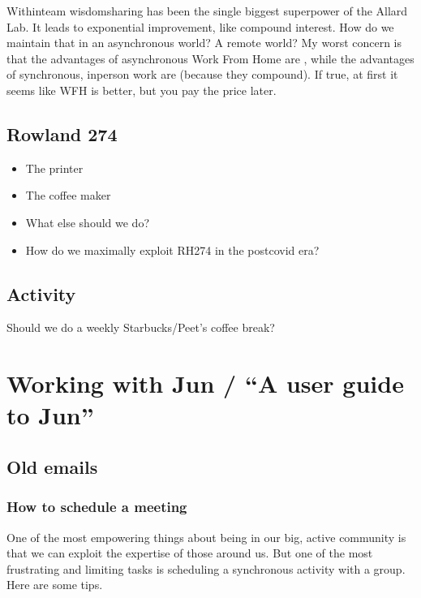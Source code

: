 \documentclass[letterpaper,10pt,english]{sphinxmanual}
\begin{document}
\sphinxAtStartPar
Within\sphinxhyphen{}team wisdom\sphinxhyphen{}sharing has been the single biggest superpower of the Allard Lab. It leads to exponential improvement, like compound interest. How do we maintain that in an asynchronous world? A remote world? My worst concern is that the advantages of asynchronous Work From Home are , while the advantages of synchronous, in\sphinxhyphen{}person work are  (because they compound). If true, at first it seems like WFH is better, but you pay the price later.


\section{Rowland 274}
\label{\detokenize{05Group:rowland-274}}\begin{itemize}
\item {} 
\sphinxAtStartPar
The printer

\item {} 
\sphinxAtStartPar
The coffee maker

\item {} 
\sphinxAtStartPar
What else should we do?

\item {} 
\sphinxAtStartPar
How do we maximally exploit RH274 in the post\sphinxhyphen{}covid era?

\end{itemize}


\section{Activity}
\label{\detokenize{05Group:activity}}
\sphinxAtStartPar
Should we do a weekly Starbucks/Peet’s coffee break?


\chapter{Working with Jun / “A user guide to Jun”}
\label{\detokenize{06UserGuideToJun:working-with-jun-a-user-guide-to-jun}}\label{\detokenize{06UserGuideToJun::doc}}

\section{Old e\sphinxhyphen{}mails}
\label{\detokenize{OldEmails:old-e-mails}}\label{\detokenize{OldEmails::doc}}

\subsection{How to schedule a meeting}
\label{\detokenize{OldEmails:how-to-schedule-a-meeting}}\label{\detokenize{OldEmails:scheduling}}
\sphinxAtStartPar
One of the most empowering things about being in our big, active community is that we can exploit the expertise of those around us.
But one of the most frustrating and limiting tasks is scheduling a synchronous activity with a group.
Here are some tips.
\end{document}
